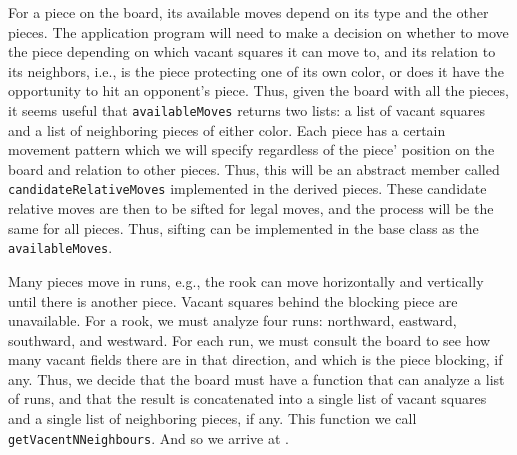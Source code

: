 \documentclass[fsharpNotes.tex]{subfiles}
\begin{document}
For a piece on the board, its available moves depend on its type and the other pieces. The application program will need to make a decision on whether to move the piece depending on which vacant squares it can move to, and its relation to its neighbors, i.e., is the piece protecting one of its own color, or does it have the opportunity to hit an opponent's piece. Thus, given the board with all the pieces, it seems useful that \lstinline{availableMoves} returns two lists: a list of vacant squares and a list of neighboring pieces of either color. Each piece has a certain movement pattern which we will specify regardless of the piece' position on the board and relation to other pieces. Thus, this will be an abstract member called \lstinline{candidateRelativeMoves} implemented in the derived pieces. These candidate relative moves are then to be sifted for legal moves, and the process will be the same for all pieces. Thus, sifting can be implemented in the base class as the \lstinline{availableMoves}.

Many pieces move in runs, e.g., the rook can move horizontally and vertically until there is another piece. Vacant squares behind the blocking piece are unavailable. For a rook, we must analyze four runs: northward, eastward, southward, and westward. For each run, we must consult the board to see how many vacant fields there are in that direction, and which is the piece blocking, if any. Thus, we decide that the board must have a function that can analyze a list of runs, and that the result is concatenated into a single list of vacant squares and a single list of neighboring pieces, if any. This function we call \lstinline{getVacentNNeighbours}. And so we arrive at .
%
%
\clearpage%
\end{document}
